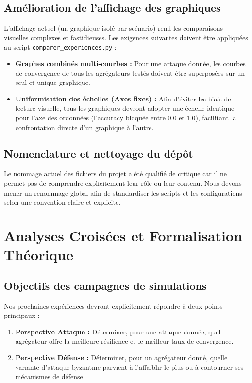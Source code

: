 \documentclass[11pt, a4paper]{article}
\begin{document}
\subsection{Amélioration de l'affichage des graphiques}
L'affichage actuel (un graphique isolé par scénario) rend les comparaisons visuelles complexes et fastidieuses. Les exigences suivantes doivent être appliquées au script \texttt{comparer\_experiences.py} :
\begin{itemize}
    \item \textbf{Graphes combinés multi-courbes :} Pour une attaque donnée, les courbes de convergence de tous les agrégateurs testés doivent être superposées sur un seul et unique graphique.
    \item \textbf{Uniformisation des échelles (Axes fixes) :} Afin d'éviter les biais de lecture visuelle, tous les graphiques devront adopter une échelle identique pour l'axe des ordonnées (l'accuracy bloquée entre $0.0$ et $1.0$), facilitant la confrontation directe d'un graphique à l'autre.
\end{itemize}

\subsection{Nomenclature et nettoyage du dépôt}
Le nommage actuel des fichiers du projet a été qualifié de critique car il ne permet pas de comprendre explicitement leur rôle ou leur contenu. Nous devons mener un renommage global afin de standardiser les scripts et les configurations selon une convention claire et explicite.

\section{Analyses Croisées et Formalisation Théorique}

\subsection{Objectifs des campagnes de simulations}
Nos prochaines expériences devront explicitement répondre à deux points principaux :
\begin{enumerate}
    \item \textbf{Perspective Attaque :} Déterminer, pour une attaque donnée, quel agrégateur offre la meilleure résilience et le meilleur taux de convergence.
    \item \textbf{Perspective Défense :} Déterminer, pour un agrégateur donné, quelle variante d'attaque byzantine parvient à l'affaiblir le plus ou à contourner ses mécanismes de défense. %
\end{enumerate}
\end{document}

